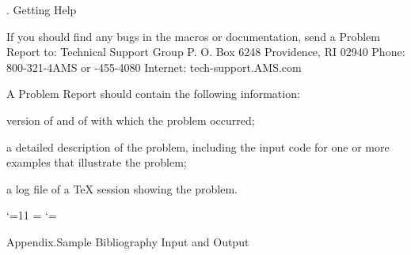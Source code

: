 
. Getting Help
\endhead

If you should find any bugs in the macros or documentation,
send a Problem Report to:
\beginexample{\rm}
Technical Support Group
\AMS{}
P. O. Box 6248
Providence, RI 02940
\vskip 2pt %
Phone: 800-321-4AMS \quad or -455-4080
Internet: tech-support\@Math.AMS.com
\endexample

A Problem Report should contain the following information:
\roster
\item version of  and of  with which
  the problem occurred;
\item a detailed description of the problem, including the input code for
  one or more examples that illustrate the problem;
\item a log file of a \TeX{} session showing the problem.
\endroster



\newpage


\catcode`\@=11
\newdimen\headlinewidth
\headlinewidth=\hsize
\def\makeheadline{\vbox to\z@{\vskip-22.5\p@
  \hbox to\headlinewidth{\vbox to8.5\p@{}\the\headline}\vss}\nointerlineskip}
\catcode`\@=\active

\pagewidth{47.5pc}
\pageheight{30pc}

\head Appendix.\quad Sample Bibliography Input and Output
\endhead

